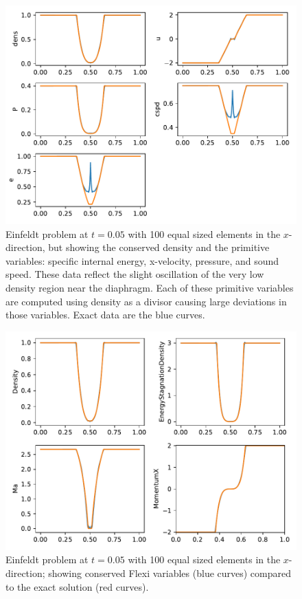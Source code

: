 \begin{figure}[h!]
 \centering
 \includegraphics[scale=0.8]{figures/einfeldt-PV.pdf}
 \caption{Einfeldt problem at $t = 0.05$ with 100 equal sized elements in the $x$-direction, but showing the conserved density and the primitive variables: specific internal energy, x-velocity, pressure, and sound speed.  These data reflect the slight oscillation of the very low density region near the diaphragm. Each of these primitive variables are computed using density as a divisor causing large deviations in those variables. Exact data are the blue curves.}
 \label{fig:PVmulti123}
\end{figure}

\begin{figure}[h!]
 \centering
 \includegraphics[scale=0.8]{figures/einfeldt-CV.pdf}
 \caption{Einfeldt problem at $t = 0.05$ with 100 equal sized elements in the $x$-direction; showing conserved Flexi variables (blue curves) compared to the exact solution (red curves).}
 \label{fig:multi123}
\end{figure}


